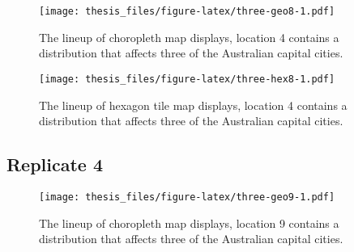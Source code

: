 \documentclass{monashthesis}
\begin{document}
\begin{figure}
\centering
\texttt{[image: thesis\_files/figure-latex/three-geo8-1.pdf]}
\caption{\label{fig:three-geo8}The lineup of choropleth map displays, location 4 contains a distribution that affects three of the Australian capital cities.}
\end{figure}

\begin{Shaded}
\begin{Highlighting}[]
\NormalTok{() }\OperatorTok{+}
\StringTok{  }\NormalTok{(}\NormalTok{(}\NormalTok{(}\NormalTok{)))}
\end{Highlighting}
\end{Shaded}

\begin{figure}
\centering
\texttt{[image: thesis\_files/figure-latex/three-hex8-1.pdf]}
\caption{\label{fig:three-hex8}The lineup of hexagon tile map displays, location 4 contains a distribution that affects three of the Australian capital cities.}
\end{figure}

\hypertarget{replicate-4-1}{%
\subsection{Replicate 4}\label{replicate-4-1}}

\begin{Shaded}
\begin{Highlighting}[]
\NormalTok{() }\OperatorTok{+}
\StringTok{  }\NormalTok{(}\NormalTok{(}\NormalTok{(}\NormalTok{)))}
\end{Highlighting}
\end{Shaded}

\begin{figure}
\centering
\texttt{[image: thesis\_files/figure-latex/three-geo9-1.pdf]}
\caption{\label{fig:three-geo9}The lineup of choropleth map displays, location 9 contains a distribution that affects three of the Australian capital cities.}
\end{figure}

\begin{Shaded}
\begin{Highlighting}[]
\NormalTok{() }\OperatorTok{+}
\StringTok{  }\NormalTok{(}\NormalTok{(}\NormalTok{(}\NormalTok{)))}
\end{Highlighting}
\end{Shaded}
\end{document}
